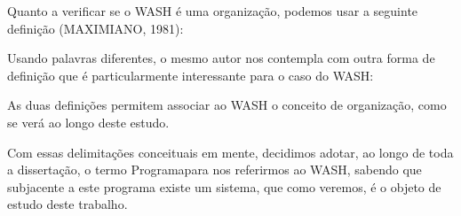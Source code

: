 \documentclass[
12pt,		%
openright,	%
twoside,  %
a4paper,			%
chapter=TITLE,		%
english,			%
french,				%
spanish,			%
brazil				%
]{USPSC-classe/USPSC}
\begin{document}
\noindent\begin{center}\mbox{\centering{}}\end{center}


Quanto a verificar se o WASH \'e uma organiza\c{c}\~ao, podemos usar a seguinte defini\c{c}\~ao  (MAXIMIANO, 1981):










\noindent\begin{center}\mbox{\centering{}}\end{center}


Usando palavras diferentes, o mesmo autor nos contempla com outra forma de defini\c{c}\~ao que \'e particularmente interessante para o caso do WASH:










\noindent\begin{center}\mbox{\centering{}}\end{center}


As duas defini\c{c}\~oes permitem associar ao WASH o conceito de organiza\c{c}\~ao, como se ver\'a ao longo deste estudo.









Com essas delimita\c{c}\~oes conceituais em mente, decidimos adotar, ao longo de toda a disserta\c{c}\~ao, o termo \textquotedbl Programa\textquotedbl  para nos referirmos ao WASH, sabendo que subjacente a este programa existe um sistema, que como veremos, \'e o objeto de estudo deste trabalho.
\end{document}

